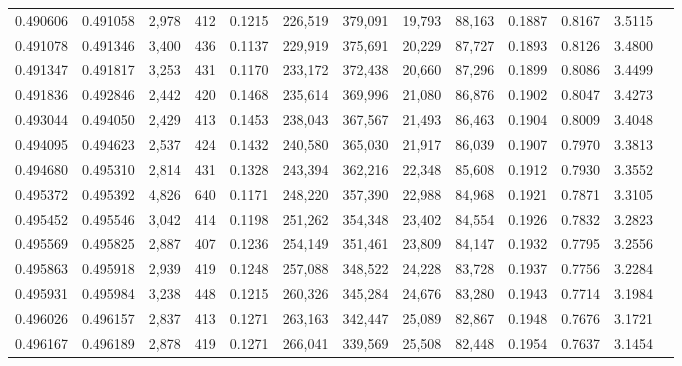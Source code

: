 \begin{tabular}{rrrrrrrrrrrrr}
0.490606 & 0.491058 & 2,978 &   412 &                                     0.1215 & 226,519 & 379,091 &  19,793 &  88,163 & 0.1887 & 0.8167 & 3.5115 \\
0.491078 & 0.491346 & 3,400 &   436 &                                     0.1137 & 229,919 & 375,691 &  20,229 &  87,727 & 0.1893 & 0.8126 & 3.4800 \\
0.491347 & 0.491817 & 3,253 &   431 &                                     0.1170 & 233,172 & 372,438 &  20,660 &  87,296 & 0.1899 & 0.8086 & 3.4499 \\
0.491836 & 0.492846 & 2,442 &   420 &                                     0.1468 & 235,614 & 369,996 &  21,080 &  86,876 & 0.1902 & 0.8047 & 3.4273 \\
0.493044 & 0.494050 & 2,429 &   413 &                                     0.1453 & 238,043 & 367,567 &  21,493 &  86,463 & 0.1904 & 0.8009 & 3.4048 \\
0.494095 & 0.494623 & 2,537 &   424 &                                     0.1432 & 240,580 & 365,030 &  21,917 &  86,039 & 0.1907 & 0.7970 & 3.3813 \\
0.494680 & 0.495310 & 2,814 &   431 &                                     0.1328 & 243,394 & 362,216 &  22,348 &  85,608 & 0.1912 & 0.7930 & 3.3552 \\
0.495372 & 0.495392 & 4,826 &   640 &                                     0.1171 & 248,220 & 357,390 &  22,988 &  84,968 & 0.1921 & 0.7871 & 3.3105 \\
0.495452 & 0.495546 & 3,042 &   414 &                                     0.1198 & 251,262 & 354,348 &  23,402 &  84,554 & 0.1926 & 0.7832 & 3.2823 \\
0.495569 & 0.495825 & 2,887 &   407 &                                     0.1236 & 254,149 & 351,461 &  23,809 &  84,147 & 0.1932 & 0.7795 & 3.2556 \\
0.495863 & 0.495918 & 2,939 &   419 &                                     0.1248 & 257,088 & 348,522 &  24,228 &  83,728 & 0.1937 & 0.7756 & 3.2284 \\
0.495931 & 0.495984 & 3,238 &   448 &                                     0.1215 & 260,326 & 345,284 &  24,676 &  83,280 & 0.1943 & 0.7714 & 3.1984 \\
0.496026 & 0.496157 & 2,837 &   413 &                                     0.1271 & 263,163 & 342,447 &  25,089 &  82,867 & 0.1948 & 0.7676 & 3.1721 \\
0.496167 & 0.496189 & 2,878 &   419 &                                     0.1271 & 266,041 & 339,569 &  25,508 &  82,448 & 0.1954 & 0.7637 & 3.1454 \\

\end{tabular}
